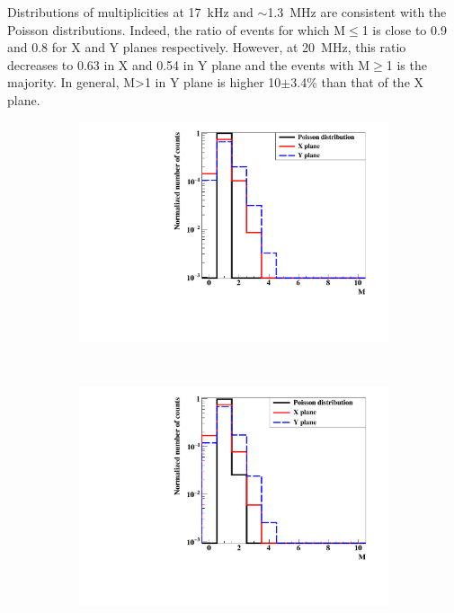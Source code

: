 \documentclass[a4paper,11pt]{article}
\begin{document}
Distributions of multiplicities at 17~kHz and $\sim$1.3~MHz are consistent with the Poisson distributions. Indeed, the ratio of events for which M$\leq$1 is close to 0.9 and 0.8 for X and Y planes respectively. However, at 20~MHz, this ratio decreases to 0.63 in X and 0.54 in Y plane and the events with M$\geq$1 is the majority. In general, M>1 in Y plane is higher 10$\pm$3.4\% than that of the X plane.
\begin{figure}[H]
\centering
    \begin{subfigure}{0.3\textwidth} \centering \includegraphics[width=\textwidth]{figures/Involved_fibers_17kHz_without_X=0.pdf} \caption{} \label{fig:Fibers_17kHz}
    \end{subfigure}
    ~
    \begin{subfigure}{0.3\textwidth} \centering \includegraphics[width=\textwidth]{figures/Involved_fibers_1MHz_without_X=0.pdf} \caption{} \label{fig:Fibers_1MHz}

\end{subfigure}
\end{figure}
\end{document}
